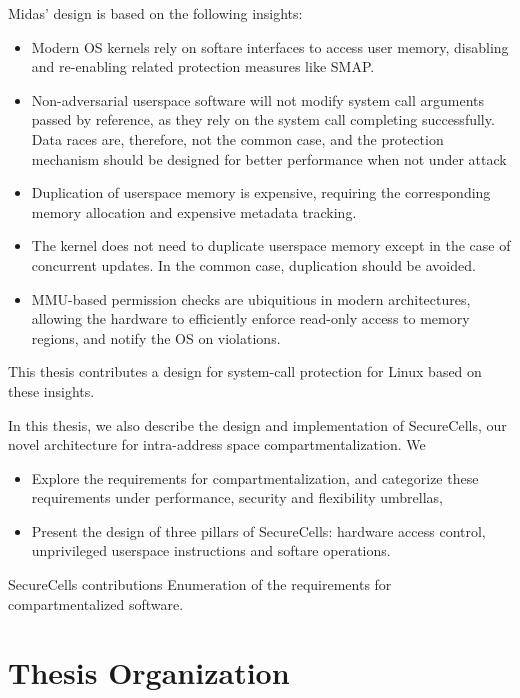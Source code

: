 Midas' design is based on the following insights:
\begin{itemize}
  \item Modern OS kernels rely on softare interfaces to access
        user memory, disabling and re-enabling related
        protection measures like SMAP.
  \item Non-adversarial userspace software will not modify
        system call arguments passed by reference, as they
        rely on the system call completing successfully.
        Data races are, therefore, not the common case, and
        the protection mechanism should be designed for better
        performance when not under attack
  \item Duplication of userspace memory is expensive, requiring
        the corresponding memory allocation and expensive
        metadata tracking.
  \item The kernel does not need to duplicate userspace memory
        except in the case of concurrent updates. In the common
        case, duplication should be avoided.
  \item MMU-based permission checks are ubiquitious in modern
        architectures, allowing the hardware to efficiently
        enforce read-only access to memory regions, and
        notify the OS on violations.
\end{itemize}
This thesis contributes a design for system-call protection for Linux
based on these insights.

In this thesis, we also describe the design and implementation of
SecureCells, our novel architecture for intra-address space
compartmentalization.
We
\begin{itemize}
  \item Explore the requirements for compartmentalization, and
        categorize these requirements under performance, security
        and flexibility umbrellas,
  \item Present the design of three pillars of SecureCells: 
        hardware access control, unprivileged userspace instructions
        and softare operations.
\end{itemize}


SecureCells contributions
Enumeration of the requirements for compartmentalized software.

\section{Thesis Organization}

